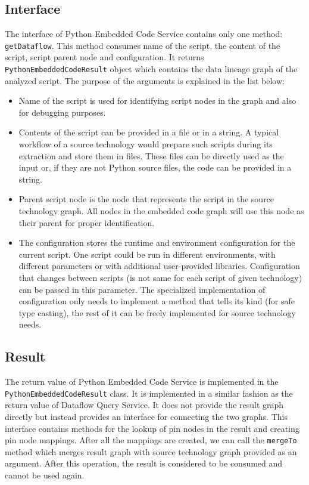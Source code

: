 \subsection{Interface}

The interface of Python Embedded Code Service contains only one method: \texttt{getDataflow}. This method consumes name of the script, the content of the script, script parent node and configuration. It returns \texttt{PythonEmbeddedCodeResult} object which contains the data lineage graph of the analyzed script. The purpose of the arguments is explained in the list below:
\begin{itemize}
    \item Name of the script is used for identifying script nodes in the graph and also for debugging purposes.
    \item Contents of the script can be provided in a file or in a string. A typical workflow of a source technology would prepare such scripts during its extraction and store them in files. These files can be directly used as the input or, if they are not Python source files, the code can be provided in a string.
    \item Parent script node is the node that represents the script in the source technology graph. All nodes in the embedded code graph will use this node as their parent for proper identification.
    \item The configuration stores the runtime and environment configuration for the current script. One script could be run in different environments, with different parameters or with additional user-provided libraries. Configuration that changes between scripts (is not same for each script of given technology) can be passed in this parameter. The specialized implementation of configuration only needs to implement a method that tells its kind (for safe type casting), the rest of it can be freely implemented for source technology needs.   
\end{itemize}

\subsection{Result}
The return value of Python Embedded Code Service is implemented in the \texttt{PythonEmbeddedCodeResult} class. It is implemented in a similar fashion as the return value of Dataflow Query Service. It does not provide the result graph directly but instead provides an interface for connecting the two graphs. This interface contains methods for the lookup of pin nodes in the result and creating pin node mappings. After all the mappings are created, we can call the \texttt{mergeTo} method which merges result graph with source technology graph provided as an argument. After this operation, the result is considered to be consumed and cannot be used again.

